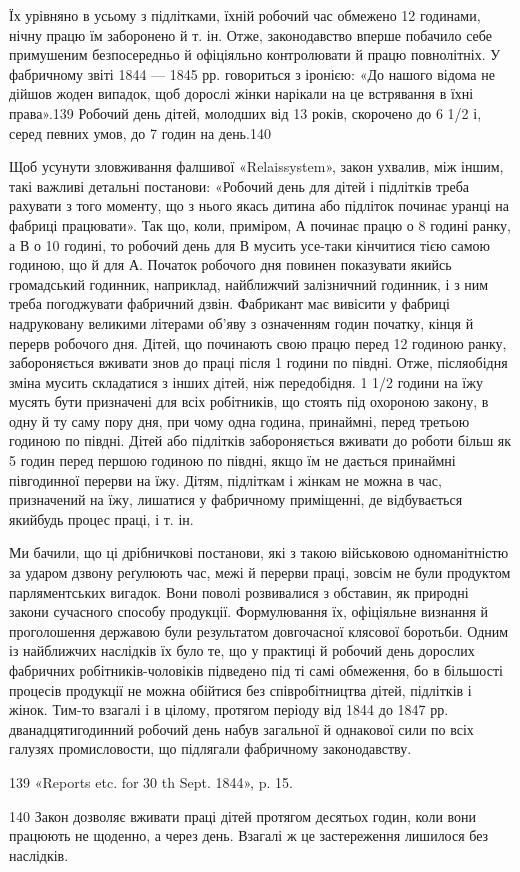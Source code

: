 Їх урівняно в усьому з підлітками, їхній робочий час обмежено
12 годинами, нічну працю їм заборонено й т. ін. Отже, законодавство
вперше побачило себе примушеним безпосередньо й офіціяльно
контролювати й працю повнолітніх. У фабричному звіті 1844 —
1845 рр. говориться з іронією: «До нашого відома не дійшов
жоден випадок, щоб дорослі жінки нарікали на це встрявання
в їхні права».139 Робочий день дітей, молодших від 13 років,
скорочено до 6 1/2 і, серед певних умов, до 7 годин на день.140

Щоб усунути зловживання фалшивої «Relaissystem», закон
ухвалив, між іншим, такі важливі детальні постанови: «Робочий
день для дітей і підлітків треба рахувати з того моменту, що з
нього якась дитина або підліток починає уранці на фабриці
працювати». Так що, коли, приміром, А починає працю о 8 годині
ранку, а В о 10 годині, то робочий день для В мусить усе-таки кінчитися тією самою годиною, що й для
А. Початок робочого
дня повинен показувати якийсь громадський годинник, наприклад,
найближчий залізничний годинник, і з ним треба погоджувати
фабричний дзвін. Фабрикант має вивісити у фабриці надруковану
великими літерами об’яву з означенням годин початку,
кінця й перерв робочого дня. Дітей, що починають свою працю
перед 12 годиною ранку, забороняється вживати знов до праці
після 1 години по півдні. Отже, післяобідня зміна мусить складатися
з інших дітей, ніж передобідня. 1 1/2 години на їжу мусять
бути призначені для всіх робітників, що стоять під охороною закону,
в одну й ту саму пору дня, при чому одна година, принаймні,
перед третьою годиною по півдні. Дітей або підлітків забороняється
вживати до роботи більш як 5 годин перед першою годиною
по півдні, якщо їм не дається принаймні півгодинної перерви на
їжу. Дітям, підліткам і жінкам не можна в час, призначений на
їжу, лишатися у фабричному приміщенні, де відбувається якийбудь
процес праці, і т. ін.

Ми бачили, що ці дрібничкові постанови, які з такою військовою
одноманітністю за ударом дзвону реґулюють час, межі й
перерви праці, зовсім не були продуктом парляментських вигадок.
Вони поволі розвивалися з обставин, як природні закони
сучасного способу продукції. Формулювання їх, офіціяльне
визнання й проголошення державою були результатом довгочасної
клясової боротьби. Одним із найближчих наслідків їх
було те, що у практиці й робочий день дорослих фабричних робітників-чоловіків
підведено під ті самі обмеження, бо в більшості
процесів продукції не можна обійтися без співробітництва дітей,
підлітків і жінок. Тим-то взагалі і в цілому, протягом періоду
від 1844 до 1847 рр. дванадцятигодинний робочий день набув загальної
й однакової сили по всіх галузях промисловости, що
підлягали фабричному законодавству.

139 «Reports etc. for 30 th Sept. 1844», p. 15.

140    Закон дозволяє вживати праці дітей протягом десятьох годин,
коли вони працюють не щоденно, а через день. Взагалі ж це застереження
лишилося без наслідків.
